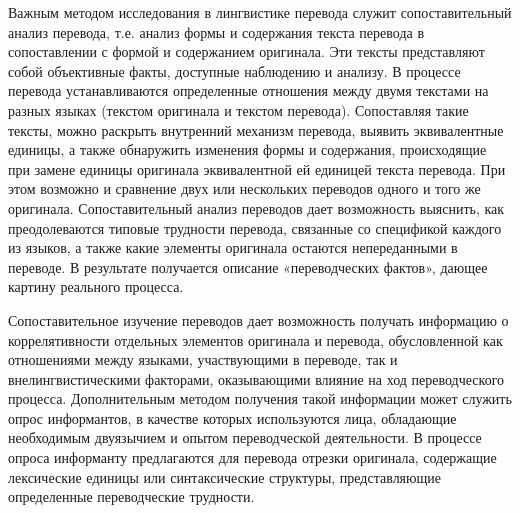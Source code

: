 Важным методом исследования в лингвистике перевода служит сопоставительный анализ перевода, т.е. анализ формы и содержания текста перевода в сопоставлении с формой и содержанием оригинала. Эти тексты представляют собой объективные факты, доступные наблюдению и анализу. В процессе перевода устанавливаются определенные отношения между двумя текстами на разных языках (текстом оригинала и текстом перевода). Сопоставляя такие тексты, можно раскрыть внутренний механизм перевода, выявить эквивалентные единицы, а также обнаружить изменения формы и содержания, происходящие при замене единицы оригинала эквивалентной ей единицей текста перевода. При этом возможно и сравнение двух или нескольких переводов одного и того же оригинала. Сопоставительный анализ переводов дает возможность выяснить, как преодолеваются типовые трудности перевода, связанные со спецификой каждого из языков, а также какие элементы оригинала остаются непереданными в переводе. В результа­те получается описание «переводческих фактов», дающее картину реального процесса.

Сопоставительное изучение переводов дает возможность по­лучать информацию о коррелятивности отдельных элементов оригинала и перевода, обусловленной как отношениями между языками, участвующими в переводе, так и внелингвистическими факторами, оказывающими влияние на ход переводческого процесса. Дополнительным методом получения такой информации может служить опрос информантов, в качестве которых используются лица, обладающие необходимым двуязычием и опытом переводческой деятельности. В процессе опроса ин­форманту предлагаются для перевода отрезки оригинала, содержащие лексические единицы или синтаксические структуры, представляющие определенные переводческие трудности.


